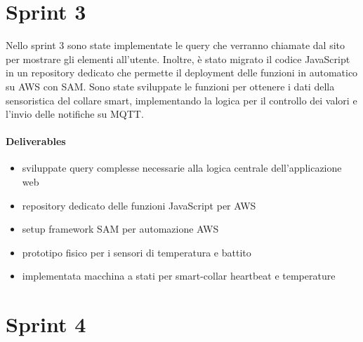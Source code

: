 \section{Sprint 3}
Nello sprint 3 sono state implementate le query che verranno chiamate dal sito per mostrare gli elementi all'utente. Inoltre, è stato migrato il codice JavaScript in un repository dedicato che permette il deployment delle funzioni in automatico su AWS con SAM. Sono state sviluppate le funzioni per ottenere i dati della sensoristica del collare smart, implementando la logica per il controllo dei valori e l'invio delle notifiche su MQTT.
\paragraph{Deliverables}
\begin{itemize}
    \item sviluppate query complesse necessarie alla logica centrale dell'applicazione web
    \item repository dedicato delle funzioni JavaScript per AWS
    \item setup framework SAM per automazione AWS
    \item prototipo fisico per i sensori di temperatura e battito
    \item implementata macchina a stati per smart-collar heartbeat e temperature
\end{itemize}

\section{Sprint 4}



